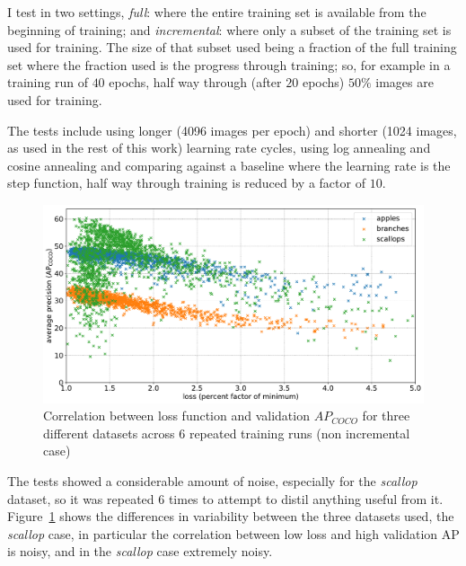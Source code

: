 I test in two settings, \emph{full}: where the entire training set is available from the beginning of training; and \emph{incremental}: where only a subset of the training set is used for training. The size of that subset used being a fraction of the full training set where the fraction used is the progress through training; so, for example in a training run of $40$ epochs, half way through (after $20$ epochs) $50\%$ images are used for training. 

The tests include using longer (4096 images per epoch) and shorter (1024 images, as used in the rest of this work) learning rate cycles, using log annealing and cosine annealing and comparing against a baseline where the learning rate is the step function, half way through training is reduced by a factor of $10$.

\begin{figure}[h]
  \centering
  \includegraphics[width=1.0\linewidth]{charts/training/lr_schedule/scatter_loss_ap.pdf}
  \caption{Correlation between loss function and validation $AP_{COCO}$ for three different datasets across 6 repeated training runs (non incremental case)}  \label{fig:scatter_loss_ap}
\end{figure}

The tests showed a considerable amount of noise, especially for the \emph{scallop} dataset, so it was repeated 6 times to attempt to distil anything useful from it. Figure~\ref{fig:scatter_loss_ap} shows the differences in variability between the three datasets used, the \emph{scallop} case, in particular the correlation between low loss and high validation \gls{AP} is noisy, and in the \emph{scallop} case extremely noisy. 

